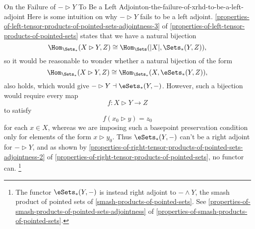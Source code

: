 \begin{remark}{On the Failure of $-\rhd Y$ To Be a Left Adjoint}{on-the-failure-of-xrhd-to-be-a-left-adjoint}%
    Here is some intuition on why $-\rhd Y$ fails to be a left adjoint. \cref{properties-of-left-tensor-products-of-pointed-sets-adjointness-3} of \cref{properties-of-left-tensor-products-of-pointed-sets} states that we have a natural bijection
    \[
        \Hom_{\Sets_{*}}(X\rhd Y,Z)%
        \cong
        \Hom_{\Sets}(|X|,\Sets_{*}(Y,Z)),%
    \]%
    so it would be reasonable to wonder whether a natural bijection of the form
   \[
        \Hom_{\Sets_{*}}(X\rhd Y,Z)%
        \cong
        \Hom_{\Sets_{*}}(X,\eSets_{*}(Y,Z)),%
    \]%
    also holds, which would give $-\rhd Y\dashv\eSets_{*}(Y,-)$. However, such a bijection would require every map
    \[
        f%
        \colon%
        X\rhd Y%
        \to%
        Z%
    \]%
    to satisfy
    \[
        f(x_{0}\rhd y)%
        =%
        z_{0}%
    \]%
    for each $x\in X$, whereas we are imposing such a basepoint preservation condition only for elements of the form $x\rhd y_{0}$. Thus $\eSets_{*}(Y,-)$ can't be a right adjoint for $-\rhd Y$, and as shown by \cref{properties-of-right-tensor-products-of-pointed-sets-adjointness-2} of \cref{properties-of-right-tensor-products-of-pointed-sets}, no functor can.%
    \footnote{%
        The functor $\eSets_{*}(Y,-)$ is instead right adjoint to $-\wedge Y$, the smash product of pointed sets of \cref{smash-products-of-pointed-sets}. See \cref{properties-of-smash-products-of-pointed-sets-adjointness} of \cref{properties-of-smash-products-of-pointed-sets}.
        \par\vspace*{\TCBBoxCorrection}
    }%
\end{remark}
